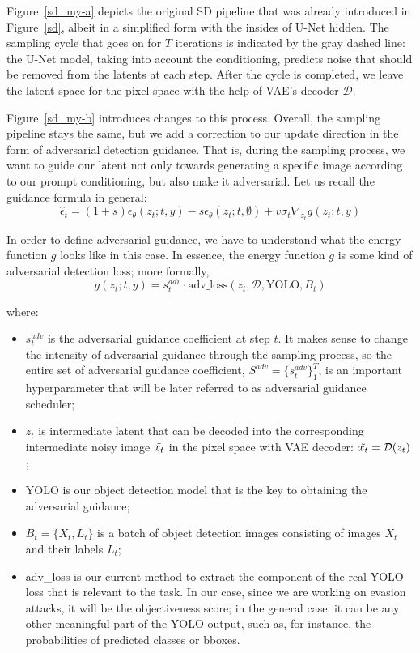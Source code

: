 Figure~\ref{sd_my-a} depicts the original SD pipeline that was already introduced in Figure~\ref{sd}, albeit in a simplified form with the insides of U-Net hidden.
The sampling cycle that goes on for $T$ iterations is indicated by the gray dashed line: the U-Net model, taking into account the conditioning, predicts noise that should be removed from the latents at each step. 
After the cycle is completed, we leave the latent space for the pixel space with the help of VAE's decoder $\mathcal{D}$.

Figure~\ref{sd_my-b} introduces changes to this process.
Overall, the sampling pipeline stays the same, but we add a correction to our update direction in the form of adversarial detection guidance. 
That is, during the sampling process, we want to guide our latent not only towards generating a specific image according to our prompt conditioning, but also make it adversarial. 
Let us recall the guidance formula in general: 
$$\hat\epsilon_t = (1+s)\epsilon_\theta(z_t;t,y) - s\epsilon_\theta(z_t;t,\emptyset) + v\sigma_t\nabla_{z_t}g(z_t; t, y)$$

In order to define adversarial guidance, we have to understand what the energy function $g$ looks like in this case.
In essence, the energy function $g$ is some kind of adversarial detection loss; more formally, 
$$g(z_t; t, y) = s^{adv}_t \cdot \text{adv\_loss}(z_t, \mathcal{D}, \text{YOLO}, B_t)$$

where:

\begin{itemize}
    \item $s^{adv}_t$ is the adversarial guidance coefficient at step $t$. 
    It makes sense to change the intensity of adversarial guidance through the sampling process, so the entire set of adversarial guidance coefficient, $S^{adv} = \{s^{adv}_t\}^T_1$, is an important hyperparameter that will be later referred to as adversarial guidance scheduler;
    \item $z_t$ is intermediate latent that can be decoded into the corresponding intermediate noisy image $\Tilde{x_t}$ in the pixel space with VAE decoder: $\Tilde{x_t} = \mathcal{D}(z_t)$; 
    \item YOLO is our object detection model that is the key to obtaining the adversarial guidance; 
    \item $B_t = \{X_t, L_t\}$ is a batch of object detection images consisting of images $X_t$ and their labels $L_t$; 
    \item adv\_loss is our current method to extract the component of the real YOLO loss that is relevant to the task. 
    In our case, since we are working on evasion attacks, it will be the objectiveness score; in the general case, it can be any other meaningful part of the YOLO output, such as, for instance, the probabilities of predicted classes or bboxes.
\end{itemize}

